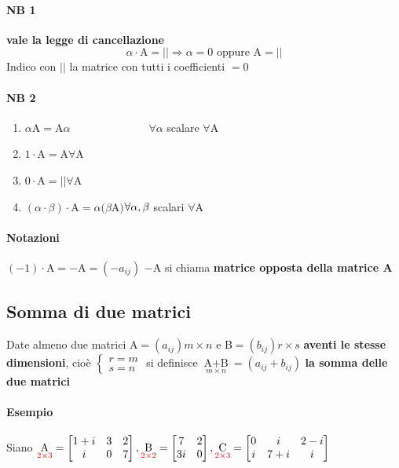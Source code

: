 \paragraph{NB 1} \textbf{vale la legge di cancellazione} \\
$$\alpha \cdot \textrm{A} = || \Longrightarrow \alpha=0\textrm{ oppure A}=||$$
Indico con $||$ la matrice con tutti i coefficienti $=0$
\paragraph{NB 2} 
\begin{enumerate} 
    \item $\alpha$A$=$A$\alpha \hspace{3cm}\forall\alpha$ scalare $\forall$A
    \item $1\cdot$A$=$A\hspace{3cm}$\forall$A
    \item $0\cdot$A$=||$\hspace{3cm}$\forall$A
    \item $(\alpha\cdot\beta)\cdot$A$=\alpha(\beta$A$)$\hspace{2cm}$\\
        \forall \alpha , \beta$ scalari
        $\forall$A
\end{enumerate} 
\paragraph{Notazioni} $(-1)\cdot$A$=-$A$=(-a_{ij})$
$-$A si chiama \textbf{matrice opposta della matrice A}
\subsection{Somma di due matrici}
Date almeno due matrici A$=(a_{ij})m\times n$ e B$=(b_{ij})r\times s$ 
\textbf{aventi le stesse dimensioni}, cioè 
$
\begin{cases}
    r=m\\
    s=n
\end{cases}
$
si definisce $\underset{m\times n}{\textrm{A}+\textrm{B}}=(a_{ij}+b_{ij})$ \textbf{la somma delle due matrici}

\paragraph{Esempio} Siano 
$
\underset{{\color{red}2\times 3}}{\textrm{A}}=
\begin{bmatrix}
    1+i & 3 & 2\\
    i   & 0 & 7
\end{bmatrix},
\underset{{\color{red}2\times 2}}{\textrm{B}}=
\begin{bmatrix}
    7 & 2\\
    3i & 0
\end{bmatrix},
\underset{{\color{red}2\times 3}}{\textrm{C}}=
\begin{bmatrix}
    0 & i   & 2-i\\
    i & 7+i & i
\end{bmatrix}
$\\ 


